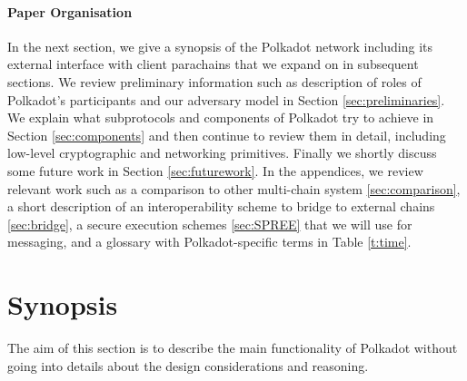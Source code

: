 \documentclass{article}
\begin{document}
\paragraph{Paper Organisation} In the next section, we give a synopsis of the Polkadot network including its external interface with client parachains that we expand on in subsequent sections. We review preliminary information such as description of roles of Polkadot's participants and our adversary model in Section \ref{sec:preliminaries}. We explain what subprotocols and components of Polkadot try to achieve in Section \ref{sec:components} and then continue to review them in detail, including low-level cryptographic and networking primitives. Finally we shortly discuss some future work in Section \ref{sec:futurework}. In the appendices, we review relevant work such as a comparison to other multi-chain system  \ref{sec:comparison}, a short description of an interoperability scheme to bridge to external chains \ref{sec:bridge}, a secure execution schemes \ref{sec:SPREE} that we will use for  messaging, and a glossary with Polkadot-specific terms in Table \ref{t:time}. 






\section{Synopsis}\label{sec:summary}
The aim of this section is to describe the main functionality of Polkadot without going into details about the design considerations and reasoning.
\end{document}
